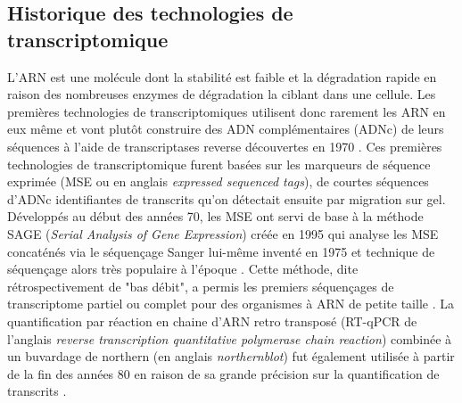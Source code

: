 \subsection{Historique des technologies de transcriptomique}

L'ARN est une molécule dont la stabilité est faible et la dégradation rapide en raison des nombreuses enzymes de dégradation la ciblant dans une cellule. Les premières technologies de transcriptomiques utilisent donc rarement les ARN en eux même et vont plutôt construire des ADN complémentaires (ADNc) de leurs séquences à l'aide de transcriptases reverse découvertes en 1970 \cite{Temin1970Jun}. Ces premières technologies de transcriptomique furent basées sur les marqueurs de séquence exprimée (MSE ou en anglais \textit{expressed sequenced tags}), de courtes séquences d'ADNc identifiantes de transcrits qu'on détectait ensuite par migration sur gel. Développés au début des années 70, les MSE ont servi de base à la méthode SAGE (\textit{Serial Analysis of Gene Expression}) créée en 1995 \cite{Velculescu1995Oct} qui analyse les MSE concaténés via le séquençage Sanger lui-même inventé en 1975 \cite{Sanger1975May} et technique de séquençage alors très populaire à l'époque \cite{Marra1998Jan}. Cette méthode, dite rétrospectivement de "bas débit", a permis les premiers séquençages de transcriptome partiel \cite{Jeppesen1970Apr} ou complet pour des organismes à ARN de petite taille \cite{Fiers1976Apr}. La quantification par réaction en chaine d'ARN retro transposé (RT-qPCR de l'anglais \textit{reverse transcription quantitative polymerase chain reaction}) combinée à un buvardage de northern (en anglais \textit{northernblot}) fut également utilisée à partir de la fin des années 80 en raison de sa grande précision sur la quantification de transcrits \cite{Becker-Andre1989Nov}.


